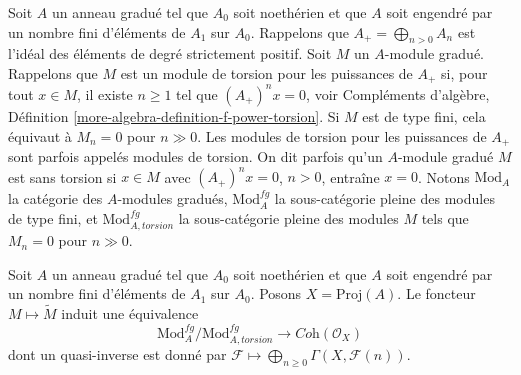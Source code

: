 \noindent
Soit $A$ un anneau gradué tel que $A_0$ soit noethérien et que $A$ soit engendré
par un nombre fini d'éléments de $A_1$ sur $A_0$. Rappelons que
$A_+ = \bigoplus_{n > 0} A_n$ est l'idéal des éléments de degré strictement positif.
Soit $M$ un $A$-module gradué. Rappelons que
$M$ est un module de torsion pour les puissances de $A_+$ si, pour tout $x \in M$,
il existe $n \geq 1$ tel que $(A_+)^n x = 0$, voir
Compléments d'algèbre, Définition \ref{more-algebra-definition-f-power-torsion}.
Si $M$ est de type fini,
cela équivaut à $M_n = 0$ pour $n \gg 0$.
Les modules de torsion pour les puissances de $A_+$ sont parfois appelés modules de torsion.
On dit parfois qu'un $A$-module gradué $M$ est sans torsion si
$x \in M$ avec $(A_+)^n x = 0$, $n > 0$, entraîne $x = 0$.
Notons $\text{Mod}_A$ la catégorie des $A$-modules gradués,
$\text{Mod}^{fg}_A$ la sous-catégorie pleine des modules de type fini,
et $\text{Mod}^{fg}_{A, torsion}$ la sous-catégorie pleine des
modules $M$ tels que $M_n = 0$ pour $n \gg 0$.

\begin{proposition}
\label{proposition-coherent-modules-on-proj}
Soit $A$ un anneau gradué tel que $A_0$ soit noethérien et que $A$ soit engendré
par un nombre fini d'éléments de $A_1$ sur $A_0$.
Posons $X = \text{Proj}(A)$. Le foncteur $M \mapsto \widetilde M$
induit une équivalence
$$
\text{Mod}^{fg}_A/\text{Mod}^{fg}_{A, torsion}
\longrightarrow
\textit{Coh}(\mathcal{O}_X)
$$
dont un quasi-inverse est donné par
$\mathcal{F} \longmapsto \bigoplus_{n \geq 0} \Gamma(X, \mathcal{F}(n))$.
\end{proposition}

